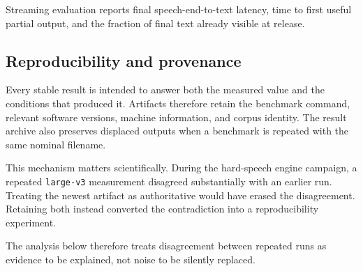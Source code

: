 Streaming evaluation reports final speech-end-to-text latency, time to first useful partial
output, and the fraction of final text already visible at release.

\subsection{Reproducibility and provenance}

Every stable result is intended to answer both the measured value and the conditions that
produced it. Artifacts therefore retain the benchmark command, relevant software versions,
machine information, and corpus identity. The result archive also preserves displaced outputs
when a benchmark is repeated with the same nominal filename.

This mechanism matters scientifically. During the hard-speech engine campaign, a repeated
\texttt{large-v3} measurement disagreed substantially with an earlier run. Treating the newest
artifact as authoritative would have erased the disagreement. Retaining both instead converted
the contradiction into a reproducibility experiment.

The analysis below therefore treats disagreement between repeated runs as evidence to be
explained, not noise to be silently replaced.
